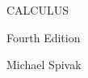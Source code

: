 \section*{}
\begin{center}
CALCULUS
\end{center}
\begin{center}
Fourth Edition
\end{center}
\begin{center}
Michael Spivak
\end{center}